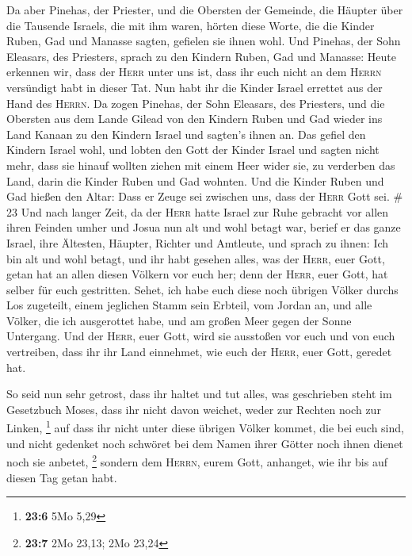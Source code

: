  Da aber Pinehas, der Priester, und die Obersten der
Gemeinde, die Häupter über die Tausende Israels, die mit ihm waren,
hörten diese Worte, die die Kinder Ruben, Gad und Manasse sagten,
gefielen sie ihnen wohl.  Und Pinehas, der Sohn Eleasars,
des Priesters, sprach zu den Kindern Ruben, Gad und Manasse: Heute
erkennen wir, dass der \textsc{Herr} unter uns ist, dass ihr euch nicht
an dem \textsc{Herrn} versündigt habt in dieser Tat. Nun habt ihr die
Kinder Israel errettet aus der Hand des \textsc{Herrn}. 
Da zogen Pinehas, der Sohn Eleasars, des Priesters, und die Obersten aus
dem Lande Gilead von den Kindern Ruben und Gad wieder ins Land Kanaan zu
den Kindern Israel und sagten's ihnen an.  Das gefiel den
Kindern Israel wohl, und lobten den Gott der Kinder Israel und sagten
nicht mehr, dass sie hinauf wollten ziehen mit einem Heer wider sie, zu
verderben das Land, darin die Kinder Ruben und Gad wohnten.
 Und die Kinder Ruben und Gad hießen den Altar: Dass er
Zeuge sei zwischen uns, dass der \textsc{Herr} Gott sei. \# 23
 Und nach langer Zeit, da der \textsc{Herr} hatte Israel
zur Ruhe gebracht vor allen ihren Feinden umher und Josua nun alt und
wohl betagt war,  berief er das ganze Israel, ihre
Ältesten, Häupter, Richter und Amtleute, und sprach zu ihnen: Ich bin
alt und wohl betagt,  und ihr habt gesehen alles, was der
\textsc{Herr}, euer Gott, getan hat an allen diesen Völkern vor euch
her; denn der \textsc{Herr}, euer Gott, hat selber für euch gestritten.
 Sehet, ich habe euch diese noch übrigen Völker durchs Los
zugeteilt, einem jeglichen Stamm sein Erbteil, vom Jordan an, und alle
Völker, die ich ausgerottet habe, und am großen Meer gegen der Sonne
Untergang.  Und der \textsc{Herr}, euer Gott, wird sie
ausstoßen vor euch und von euch vertreiben, dass ihr ihr Land einnehmet,
wie euch der \textsc{Herr}, euer Gott, geredet hat.

 So seid nun sehr getrost, dass ihr haltet und tut alles,
was geschrieben steht im Gesetzbuch Moses, dass ihr nicht davon weichet,
weder zur Rechten noch zur Linken, \footnote{\textbf{23:6} 5Mo 5,29}
 auf dass ihr nicht unter diese übrigen Völker kommet, die
bei euch sind, und nicht gedenket noch schwöret bei dem Namen ihrer
Götter noch ihnen dienet noch sie anbetet, \footnote{\textbf{23:7} 2Mo
  23,13; 2Mo 23,24}  sondern dem \textsc{Herrn}, eurem
Gott, anhanget, wie ihr bis auf diesen Tag getan habt.

